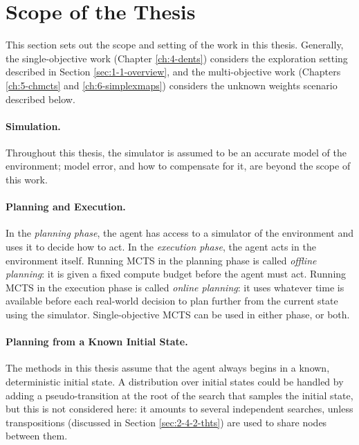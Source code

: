 \section{Scope of the Thesis}
\label{sec:1-2-scope}

    This section sets out the scope and setting of the work in this thesis. Generally, the single-objective work (Chapter \ref{ch:4-dents}) considers the exploration setting described in Section \ref{sec:1-1-overview}, and the multi-objective work (Chapters \ref{ch:5-chmcts} and \ref{ch:6-simplexmaps}) considers the unknown weights scenario described below. 

    \paragraph{Simulation.} Throughout this thesis, the simulator is assumed to be an accurate model of the environment; model error, and how to compensate for it, are beyond the scope of this work.

    \paragraph{Planning and Execution.} In the \textit{planning phase}, the agent has access to a simulator of the environment and uses it to decide how to act. In the \textit{execution phase}, the agent acts in the environment itself. Running MCTS in the planning phase is called \textit{offline planning}: it is given a fixed compute budget before the agent must act. Running MCTS in the execution phase is called \textit{online planning}: it uses whatever time is available before each real-world decision to plan further from the current state using the simulator. Single-objective MCTS can be used in either phase, or both.

    \paragraph{Planning from a Known Initial State.} The methods in this thesis assume that the agent always begins in a known, deterministic initial state. A distribution over initial states could be handled by adding a pseudo-transition at the root of the search that samples the initial state, but this is not considered here: it amounts to several independent searches, unless transpositions (discussed in Section \ref{sec:2-4-2-thts}) are used to share nodes between them.

